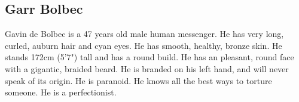 \subsection{Garr Bolbec}

Gavin de Bolbec is a 47 years old male human messenger.
He has very long, curled, auburn hair and cyan eyes.
He has smooth, healthy, bronze skin.
He stands 172cm (5'7") tall and has a round build.
He has an pleasant, round face with a gigantic, braided beard.
He is branded on his left hand, and will never speak of its origin.
He is paranoid.
He knows all the best ways to torture someone.
He is a perfectionist.
